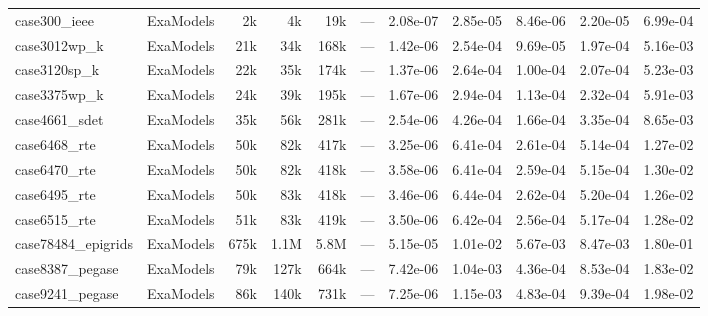 {\begin{longtable}{@{}ll rrr rrr rr r@{}}
  case300\_ieee & ExaModels & 2k & 4k & 19k & --- & 2.08e-07 & 2.85e-05 & 8.46e-06 & 2.20e-05 & 6.99e-04 \\
  case3012wp\_k & ExaModels & 21k & 34k & 168k & --- & 1.42e-06 & 2.54e-04 & 9.69e-05 & 1.97e-04 & 5.16e-03 \\
  case3120sp\_k & ExaModels & 22k & 35k & 174k & --- & 1.37e-06 & 2.64e-04 & 1.00e-04 & 2.07e-04 & 5.23e-03 \\
  case3375wp\_k & ExaModels & 24k & 39k & 195k & --- & 1.67e-06 & 2.94e-04 & 1.13e-04 & 2.32e-04 & 5.91e-03 \\
  case4661\_sdet & ExaModels & 35k & 56k & 281k & --- & 2.54e-06 & 4.26e-04 & 1.66e-04 & 3.35e-04 & 8.65e-03 \\
  case6468\_rte & ExaModels & 50k & 82k & 417k & --- & 3.25e-06 & 6.41e-04 & 2.61e-04 & 5.14e-04 & 1.27e-02 \\
  case6470\_rte & ExaModels & 50k & 82k & 418k & --- & 3.58e-06 & 6.41e-04 & 2.59e-04 & 5.15e-04 & 1.30e-02 \\
  case6495\_rte & ExaModels & 50k & 83k & 418k & --- & 3.46e-06 & 6.44e-04 & 2.62e-04 & 5.20e-04 & 1.26e-02 \\
  case6515\_rte & ExaModels & 51k & 83k & 419k & --- & 3.50e-06 & 6.42e-04 & 2.56e-04 & 5.17e-04 & 1.28e-02 \\
  case78484\_epigrids & ExaModels & 675k & 1.1M & 5.8M & --- & 5.15e-05 & 1.01e-02 & 5.67e-03 & 8.47e-03 & 1.80e-01 \\
  case8387\_pegase & ExaModels & 79k & 127k & 664k & --- & 7.42e-06 & 1.04e-03 & 4.36e-04 & 8.53e-04 & 1.83e-02 \\
  case9241\_pegase & ExaModels & 86k & 140k & 731k & --- & 7.25e-06 & 1.15e-03 & 4.83e-04 & 9.39e-04 & 1.98e-02 \\
  \bottomrule
\end{longtable}
}
